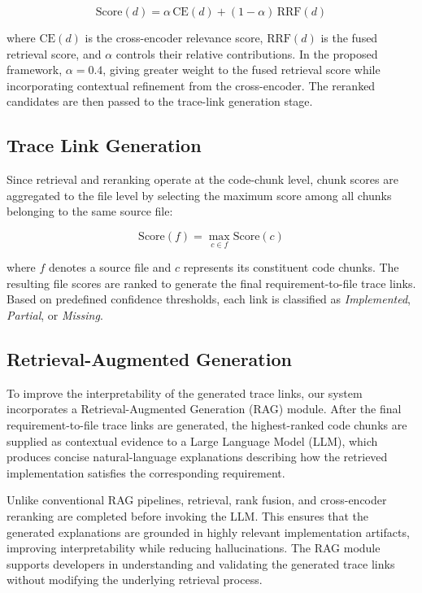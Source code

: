 \documentclass[conference]{IEEEtran}
\begin{document}
\begin{equation}
\mathrm{Score}(d)=
\alpha\,\mathrm{CE}(d)
+
(1-\alpha)\,\mathrm{RRF}(d)
\label{eq:score}
\end{equation}

where $\mathrm{CE}(d)$ is the cross-encoder relevance score, $\mathrm{RRF}(d)$ is the fused retrieval score, and $\alpha$ controls their relative contributions. In the proposed framework, $\alpha=0.4$, giving greater weight to the fused retrieval score while incorporating contextual refinement from the cross-encoder. The reranked candidates are then passed to the trace-link generation stage.

\subsection{Trace Link Generation}

Since retrieval and reranking operate at the code-chunk level, chunk scores are aggregated to the file level by selecting the maximum score among all chunks belonging to the same source file:

\begin{equation}
\mathrm{Score}(f)=
\max_{c\in f}
\mathrm{Score}(c)
\label{eq:file}
\end{equation}

where $f$ denotes a source file and $c$ represents its constituent code chunks. The resulting file scores are ranked to generate the final requirement-to-file trace links. Based on predefined confidence thresholds, each link is classified as \textit{Implemented}, \textit{Partial}, or \textit{Missing}.

\subsection{Retrieval-Augmented Generation}

To improve the interpretability of the generated trace links, our system incorporates a Retrieval-Augmented Generation (RAG) module. After the final requirement-to-file trace links are generated, the highest-ranked code chunks are supplied as contextual evidence to a Large Language Model (LLM), which produces concise natural-language explanations describing how the retrieved implementation satisfies the corresponding requirement.

Unlike conventional RAG pipelines, retrieval, rank fusion, and cross-encoder reranking are completed before invoking the LLM. This ensures that the generated explanations are grounded in highly relevant implementation artifacts, improving interpretability while reducing hallucinations. The RAG module supports developers in understanding and validating the generated trace links without modifying the underlying retrieval process.
\end{document}
